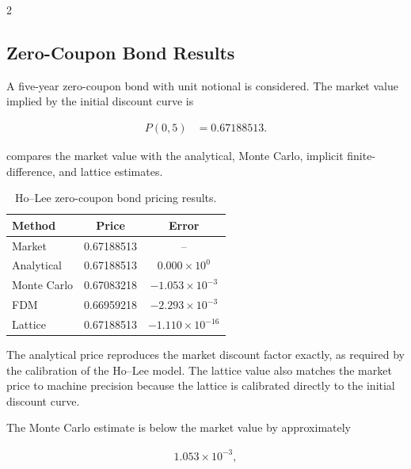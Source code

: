 \documentclass[10pt,a4paper]{article}
\numberwithin{equation}{section}
\begin{document}
\begin{multicols}{2}
\subsection{Zero-Coupon Bond Results}

A five-year zero-coupon bond with unit notional is considered. The market
value implied by the initial discount curve is

\begin{align*}
    P(0,5)
    &=
    0.67188513.
\end{align*}

 compares the market value with the analytical,
Monte Carlo, implicit finite-difference, and lattice estimates.

\begin{table}[H]
    \centering

    \caption{
        Ho--Lee zero-coupon bond pricing results.
    }
    \label{tab:zcb_results}

    \small
    \renewcommand{\arraystretch}{1.15}

    \begin{tabular}{lcc}
        \toprule
        \textbf{Method}
        &
        \textbf{Price}
        &
        \textbf{Error}
        \\
        \midrule
        Market
        & 0.67188513
        & -- \\
        Analytical
        & 0.67188513
        & $0.000\times10^{0}$ \\
        Monte Carlo
        & 0.67083218
        & $-1.053\times10^{-3}$ \\
        FDM
        & 0.66959218
        & $-2.293\times10^{-3}$ \\
        Lattice
        & 0.67188513
        & $-1.110\times10^{-16}$ \\
        \bottomrule
    \end{tabular}
\end{table}

The analytical price reproduces the market discount factor exactly, as
required by the calibration of the Ho--Lee model. The lattice value also
matches the market price to machine precision because the lattice is
calibrated directly to the initial discount curve.

The Monte Carlo estimate is below the market value by approximately

\begin{align*}
    1.053\times10^{-3},
\end{align*}


\end{multicols}
\end{document}

